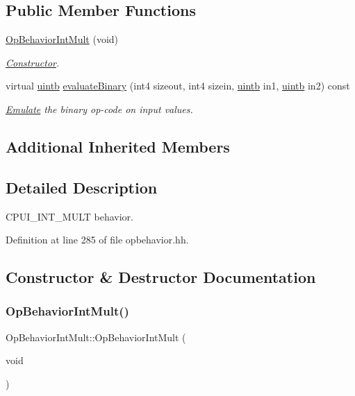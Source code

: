 \subsection*{Public Member Functions}
\begin{DoxyCompactItemize}
\item 
\mbox{\hyperlink{class_op_behavior_int_mult_aa45431425fdbe7fb0660533ff47a1e93}{Op\+Behavior\+Int\+Mult}} (void)
\begin{DoxyCompactList}\small\item\em \mbox{\hyperlink{class_constructor}{Constructor}}. \end{DoxyCompactList}\item 
virtual \mbox{\hyperlink{types_8h_a2db313c5d32a12b01d26ac9b3bca178f}{uintb}} \mbox{\hyperlink{class_op_behavior_int_mult_a2a96bb858698f27cb8e65811001290f2}{evaluate\+Binary}} (int4 sizeout, int4 sizein, \mbox{\hyperlink{types_8h_a2db313c5d32a12b01d26ac9b3bca178f}{uintb}} in1, \mbox{\hyperlink{types_8h_a2db313c5d32a12b01d26ac9b3bca178f}{uintb}} in2) const
\begin{DoxyCompactList}\small\item\em \mbox{\hyperlink{class_emulate}{Emulate}} the binary op-\/code on input values. \end{DoxyCompactList}\end{DoxyCompactItemize}
\subsection*{Additional Inherited Members}


\subsection{Detailed Description}
C\+P\+U\+I\+\_\+\+I\+N\+T\+\_\+\+M\+U\+LT behavior. 

Definition at line 285 of file opbehavior.\+hh.



\subsection{Constructor \& Destructor Documentation}
\mbox{\label{class_op_behavior_int_mult_aa45431425fdbe7fb0660533ff47a1e93}} 
\subsubsection{\texorpdfstring{OpBehaviorIntMult()}{OpBehaviorIntMult()}}
{\footnotesize\ttfamily Op\+Behavior\+Int\+Mult\+::\+Op\+Behavior\+Int\+Mult (\begin{DoxyParamCaption}\item[{void}]{ }\end{DoxyParamCaption})\hspace{0.3cm}{\ttfamily [inline]}}




